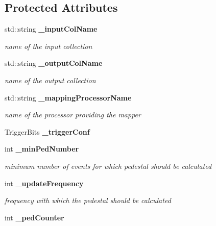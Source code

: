 \subsection*{Protected Attributes}
\begin{DoxyCompactItemize}
\item 
std::string {\bf \_\-inputColName}\label{classCALICE_1_1PedestalProcessor_ae7ff5ea5be5525611f209b13adcd7cee}

\begin{DoxyCompactList}\small\item\em name of the input collection \item\end{DoxyCompactList}\item 
std::string {\bf \_\-outputColName}\label{classCALICE_1_1PedestalProcessor_aae6d1d5e7b01e107d18f2005d893e0ca}

\begin{DoxyCompactList}\small\item\em name of the output collection \item\end{DoxyCompactList}\item 
std::string {\bf \_\-mappingProcessorName}\label{classCALICE_1_1PedestalProcessor_a2dcdb3d16775dc1b4238d07a6bc27f6f}

\begin{DoxyCompactList}\small\item\em name of the processor providing the mapper \item\end{DoxyCompactList}\item 
TriggerBits {\bfseries \_\-triggerConf}\label{classCALICE_1_1PedestalProcessor_a1cf8086fe463615886f57f0b5be05d82}

\item 
int {\bf \_\-minPedNumber}\label{classCALICE_1_1PedestalProcessor_af438d9894110cd623ef6d95425a5459c}

\begin{DoxyCompactList}\small\item\em minimum number of events for which pedestal should be calculated \item\end{DoxyCompactList}\item 
int {\bf \_\-updateFrequency}\label{classCALICE_1_1PedestalProcessor_a10205895bc6b3368876faf742beb5581}

\begin{DoxyCompactList}\small\item\em frequency with which the pedestal should be calculated \item\end{DoxyCompactList}\item 
int {\bf \_\-pedCounter}\label{classCALICE_1_1PedestalProcessor_a7ab871cec6528446d963c8d828abe0b9}


\end{DoxyCompactItemize}
